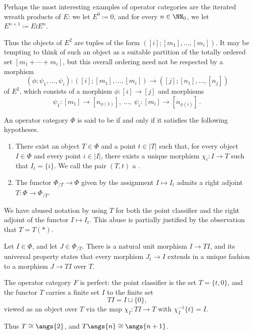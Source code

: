 \begin{eg}
	Perhaps the most interesting examples of operator categories are
	the iterated wreath products of $ E $:
	we let $ E^{0} \coloneq 0 $, and
	for every $ n \in \NN_0 $, we let $ E^{n+1} \coloneq E \wr E^{n} $.

	Thus the objects of $ E^2 $ are tuples of the form
	$ ([i]; [m_1], \dots, [m_i]) $.
	It may be tempting to think of such an object as
	a suitable partition of
	the totally ordered set $ [m_1 + \cdots + m_i] $, but
	this overall ordering need not be respected by a morphism 
	\[
		(\phi; \psi_1, \dots, \psi_i) \colon ([i]; [m_1], \dots, [m_i]) \to ([j]; [n_1], \dots, [n_j])
	\]
	of $ E^2 $,
	which consists of a morphism $ \phi \colon [i] \to [j] $ and
	morphisms
	\[
		\psi_1 \colon [m_1] \to [n_{\phi(1)}],\ 
		\dots,\ 
		\psi_i \colon [m_i] \to [n_{\phi(i)}] \period
	\]
\end{eg}

\begin{definition}
	An operator category $ \Phi $ is said to be  if and only if
	it satisfies the following hypotheses.
	\begin{enumerate}
		\item There exist an object $ T \in \Phi $ and
			a point $ t \in |T| $
			such that, for every object $ I \in \Phi $ and
			every point $ i \in |I| $,
			there exists a unique morphism $ \chi_i \colon I \to T $
			such that $ I_t = \{ i \} $.
			We call the pair $ (T,t) $ a .
		\item The functor $ \Phi_{/T} \to \Phi $
			given by the assignment $ I \mapsto I_t $
			admits a right adjoint $ T \colon \Phi \to \Phi_{/T} $.
	\end{enumerate}
\end{definition}

\begin{nul}
	We have abused notation by using $ T $ for both the point classifier
	and the right adjoint of the functor $ I \mapsto I_t $.
	This abuse is partially justified by the observation that $ T = T(\ast) $.

	Let $ I \in \Phi $, and let $ J \in \Phi_{/T} $.
	There is a natural unit morphism $ I \to TI $, and
	its universal property states that
	every morphism $ J_t \to I $ extends in a unique fashion to
	a morphism $ J \to TI $ over $ T $.
\end{nul}

\begin{eg}
	The operator category $ F $ is perfect:
	the point classifier is the set $ T = \{ t, 0 \} $,
	and the functor $ T $ carries a finite set $ I $
	to the finite set
	\[ TI = I \sqcup \{ 0 \} \comma \]
	viewed as an object over $ T $ via the map
	$ \chi_I \colon TI \to T $ with $ \chi_I^{-1}\{t\} = I $.

	Thus $ T \cong \angs{2} $, and
	$ T\angs{n} \cong \angs{n+1} $.
\end{eg}

